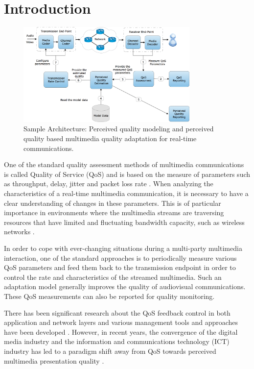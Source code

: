\documentclass[journal]{IEEEtran}
\begin{document}

\section{Introduction}
\label{sec:intro}

\begin{figure}[ht!]
  \centering
    \includegraphics[width=0.8\textwidth]{./QoEFeedback.png}
    \caption{Sample Architecture: Perceived quality modeling and perceived quality based multimedia quality adaptation for real-time communications.}
    \label{fig:QoEFeedback}
\end{figure}

One of the standard quality assessment methods of multimedia communications is called Quality of Service (QoS) and is based on the measure of parameters such as throughput, delay, jitter and packet loss rate \cite{perkiselectronic}. When analyzing the characteristics of a real-time multimedia communication, it is necessary to have a clear understanding of changes in these parameters. This is of particular importance in environments where the multimedia streams are traversing resources that have limited and fluctuating bandwidth capacity, such as wireless networks \cite{hansen2013assessing}.

In order to cope with ever-changing situations during a multi-party multimedia interaction, one of the standard approaches is to periodically measure various QoS parameters and feed them back to the transmission endpoint in order to control the rate and characteristics of the streamed multimedia. Such an adaptation model generally improves the quality of audiovisual communications. These QoS measurements can also be reported for quality monitoring.

There has been significant research about the QoS feedback control in both application and network layers and various management tools and approaches have been developed \cite{bordetsky2001feedback}. However, in recent years, the convergence of the digital media industry and the information and communications technology (ICT) industry has led to a paradigm shift away from QoS towards perceived multimedia presentation quality \cite{perkiselectronic}.
\end{document}
